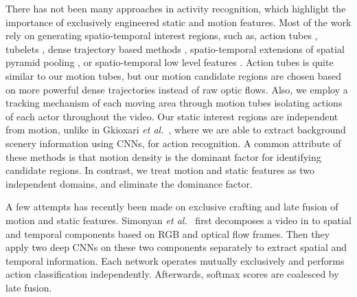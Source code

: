 
There has not been many approaches in activity recognition, which highlight the
importance of exclusively engineered static and motion features. Most of the work
rely on generating spatio-temporal interest regions, such as, action tubes \cite{gkioxari2015finding},
tubelets \cite{jain2014action}, dense trajectory based methods \cite{van2015apt, wang2015action},
spatio-temporal extensions of spatial pyramid pooling \cite{laptev2008learning},
or spatio-temporal low level features  \cite{schuldt2004recognizing, ke2005efficient,shechtman2005space, wang2011action, klaser2008spatio, yu2010real}. Action tubes \cite{gkioxari2015finding} is quite similar to
our motion tubes, but our motion candidate regions are chosen based on more powerful dense trajectories \cite{wang2011action} instead of
raw optic flows. Also, we employ a tracking mechanism of each moving area through motion tubes isolating actions
of each actor throughout the video. Our static interest regions are independent from motion,
unlike in Gkioxari \textit{et al.}~\cite{gkioxari2015finding}, where we are able to extract background scenery information using CNNs, for
action recognition.
A common attribute of these methods is that motion density is the
dominant factor for identifying candidate regions.
In contrast, we treat motion and static features
as two independent domains, and eliminate the dominance factor.

A few attempts has recently been made on exclusive crafting and late fusion
of motion and static features. Simonyan \textit{et al.}~\cite{simonyan2014two} first decomposes a video in to
spatial and temporal components based on RGB and optical flow frames.
Then they apply two deep CNNs on these two components separately to extract spatial and
temporal information. Each network operates mutually exclusively and performs action classification
independently. Afterwards, softmax scores are coalesced by late fusion.

